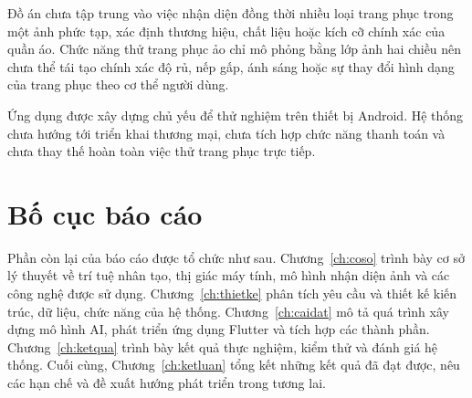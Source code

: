 Đồ án chưa tập trung vào việc nhận diện đồng thời nhiều loại trang phục
trong một ảnh phức tạp, xác định thương hiệu, chất liệu hoặc kích cỡ chính
xác của quần áo. Chức năng thử trang phục ảo chỉ mô phỏng bằng lớp ảnh hai
chiều nên chưa thể tái tạo chính xác độ rủ, nếp gấp, ánh sáng hoặc sự thay đổi
hình dạng của trang phục theo cơ thể người dùng.

Ứng dụng được xây dựng chủ yếu để thử nghiệm trên thiết bị Android. Hệ thống
chưa hướng tới triển khai thương mại, chưa tích hợp chức năng thanh toán và
chưa thay thế hoàn toàn việc thử trang phục trực tiếp.

\section{Bố cục báo cáo}

Phần còn lại của báo cáo được tổ chức như sau. Chương~\ref{ch:coso} trình
bày cơ sở lý thuyết về trí tuệ nhân tạo, thị giác máy tính, mô hình nhận diện
ảnh và các công nghệ được sử dụng. Chương~\ref{ch:thietke} phân tích yêu cầu
và thiết kế kiến trúc, dữ liệu, chức năng của hệ thống. Chương~\ref{ch:caidat}
mô tả quá trình xây dựng mô hình AI, phát triển ứng dụng Flutter và tích hợp
các thành phần. Chương~\ref{ch:ketqua} trình bày kết quả thực nghiệm, kiểm
thử và đánh giá hệ thống. Cuối cùng, Chương~\ref{ch:ketluan} tổng kết những
kết quả đã đạt được, nêu các hạn chế và đề xuất hướng phát triển trong tương
lai.
